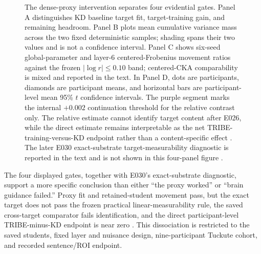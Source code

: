 \begin{figure}[H]
  \centering
  \caption{The dense-proxy intervention separates four evidential gates. Panel A distinguishes KD baseline target fit, target-training gain, and remaining headroom. Panel B plots mean cumulative variance mass across the two fixed deterministic samples; shading spans their two values and is not a confidence interval. Panel C shows six-seed global-parameter and layer-6 centered-Frobenius movement ratios against the frozen $|\log r|\leq0.10$ band; centered-CKA comparability is mixed and reported in the text. In Panel D, dots are participants, diamonds are participant means, and horizontal bars are participant-level mean 95\% $t$ confidence intervals. The purple segment marks the internal $+0.002$ continuation threshold for the relative contrast only. The relative estimate cannot identify target content after E026, while the direct estimate remains interpretable as the net TRIBE-training-versus-KD endpoint rather than a content-specific effect . The later E030 exact-substrate target-measurability diagnostic is reported in the text and is not shown in this four-panel figure .}
  \label{fig:identification-chain}
\end{figure}

The four displayed gates, together with E030's exact-substrate diagnostic, support a more specific conclusion than either ``the proxy worked'' or ``brain guidance failed.''
Proxy fit and retained-student movement pass, but the exact target does not pass the frozen practical linear-measurability rule, the saved cross-target comparator fails identification, and the direct participant-level TRIBE-minus-KD endpoint is near zero .
This dissociation is restricted to the saved students, fixed layer and nuisance design, nine-participant Tuckute cohort, and recorded sentence/ROI endpoint.
